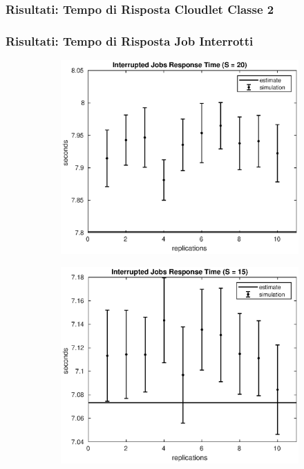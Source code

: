 \begin{frame}
\frametitle{Risultati: Tempo di Risposta Cloudlet Classe 2}

\end{frame}
\begin{frame}
\frametitle{Risultati: Tempo di Risposta Job Interrotti}
%
%
\begin{figure}[!h]
\centering
%
\begin{subfigure}[t]{0.49\textwidth}
\includegraphics[width=\textwidth]{../figures/simul/20_500K_sintr}
\label{20_sintr}
\end{subfigure}
%
\begin{subfigure}[t]{0.49\textwidth}
\includegraphics[width=\textwidth]{../figures/simul/15_500K_sintr}

\end{subfigure}
\end{figure}
\end{frame}

